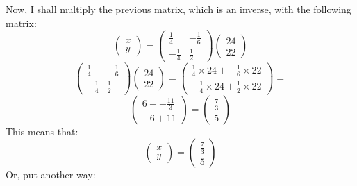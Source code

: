 \documentclass[a4paper,10pt]{article}
\begin{document}
      Now, I shall multiply the previous matrix, which is an inverse, with the following matrix:
      \begin{equation*}
         \begin{pmatrix}
           x\\y
         \end{pmatrix}
         =
         \begin{pmatrix}
           \frac{1}{4} & -\frac{1}{6}\\-\frac{1}{4} & \frac{1}{2}
         \end{pmatrix}
         \begin{pmatrix}
           24\\22
         \end{pmatrix}

      \end{equation*}
      \begin{equation*}
        \begin{pmatrix}
          \frac{1}{4} & -\frac{1}{6}\\-\frac{1}{4} & \frac{1}{2}
        \end{pmatrix}
        \begin{pmatrix}
          24\\22
        \end{pmatrix}
         =
        \begin{pmatrix}
          \frac{1}{4} \times 24 + -\frac{1}{6} \times 22\\
          -\frac{1}{4} \times 24 + \frac{1}{2} \times 22
        \end{pmatrix}
         =
      \end{equation*}
      \begin{equation*}
        \begin{pmatrix}
          6 + -\frac{11}{3}\\
          -6 + 11
        \end{pmatrix}
         =
        \begin{pmatrix}
          \frac{7}{3}\\5
        \end{pmatrix}
      \end{equation*}
      This means that:
      \begin{equation*}
        \begin{pmatrix}
          x\\y
        \end{pmatrix}
         =
        \begin{pmatrix}
          \frac{7}{3}\\5
        \end{pmatrix}
      \end{equation*}
      Or, put another way:
\end{document}
